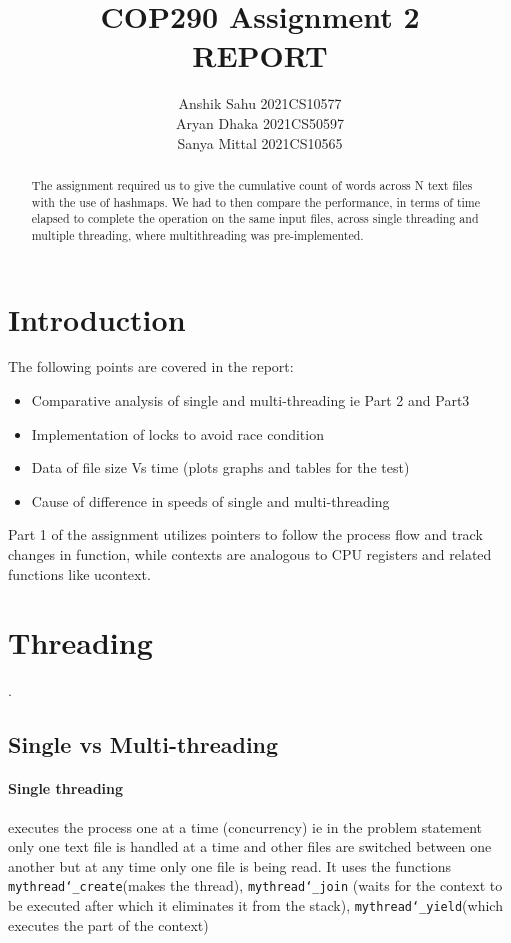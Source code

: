 \documentclass{article}
\date{}
\title{\liningfont COP290 Assignment 2 \\ REPORT}
\author{\liningfont Anshik Sahu \quad 2021CS10577 \\ Aryan Dhaka \quad 2021CS50597 \\ Sanya Mittal \quad 2021CS10565}
\begin{document}
\maketitle
\thispagestyle{empty}
\pagestyle{empty}



\begin{abstract}
\noindent The assignment required us to give the cumulative count of words across N text files with the use of hashmaps. We had to then compare the performance, in terms of time elapsed to complete the operation on the same input files, across single threading and multiple threading, where multithreading was pre-implemented. 
\end{abstract}

\section{Introduction}

The following points are covered in the report:

\begin{itemize}
    \item Comparative analysis of single and multi-threading ie Part 2 and Part3 
    \item Implementation of locks to avoid race condition
    \item Data of file size Vs time (plots graphs and tables for the test)  
    \item Cause of difference in speeds of single and multi-threading
\end{itemize}

Part 1 of the assignment utilizes pointers to follow the process flow and track changes in function, while contexts are analogous to CPU registers and related functions like ucontext.

\section{Threading}
.
\subsection{Single vs Multi-threading}

\paragraph{Single threading} executes the process one at a time (concurrency) ie in the problem statement only one text file is handled at a time and other files are switched between one another but at any time only one file is being read. It uses the functions \texttt{mythread\char`_create}(makes the thread), \texttt{mythread\char`_join} (waits for the context to be executed after which it eliminates it from the stack), \texttt{mythread\char`_yield}(which executes the part of the context)
\end{document}
